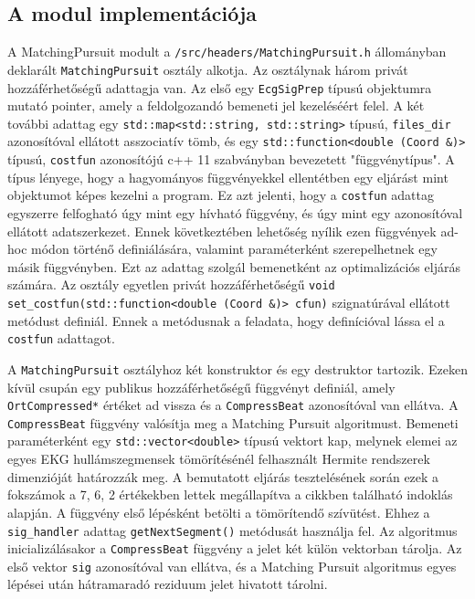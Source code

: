 \documentclass[oneside,titlepage,12pt,a4paper]{report}
\begin{document}
\subsection*{A modul implementációja}

\par A MatchingPursuit modult a \texttt{/src/headers/MatchingPursuit.h} állományban deklarált \texttt{MatchingPursuit} osztály alkotja. Az osztálynak három privát hozzáférhetőségű adattagja van. Az első egy \texttt{EcgSigPrep} típusú objektumra mutató pointer, amely a feldolgozandó bemeneti jel kezeléséért felel. A két további adattag egy \texttt{std::map<std::string, std::string>} típusú, \texttt{files\_dir} azonosítóval ellátott asszociatív tömb, és egy \texttt{std::function<double (Coord \&)>} típusú, \texttt{costfun} azonosítójú c++ 11 szabványban bevezetett "függvénytípus". A típus lényege, hogy a hagyományos függvényekkel ellentétben egy eljárást mint objektumot képes kezelni a program. Ez azt jelenti, hogy a \texttt{costfun} adattag egyszerre felfogható úgy mint egy hívható függvény, és úgy mint egy azonosítóval ellátott adatszerkezet. Ennek következtében lehetőség nyílik ezen függvények ad-hoc módon történő definiálására, valamint paraméterként szerepelhetnek egy másik függvényben. Ezt az adattag szolgál bemenetként az optimalizációs eljárás számára. Az osztály egyetlen privát hozzáférhetőségű \texttt{void set\_costfun(std::function<double (Coord \&)> cfun)} szignatúrával ellátott metódust definiál. Ennek a metódusnak a feladata, hogy definícióval lássa el a \texttt{costfun} adattagot. 
\par A \texttt{MatchingPursuit} osztályhoz két konstruktor és egy destruktor tartozik. Ezeken kívül csupán egy publikus hozzáférhetőségű függvényt definiál, amely \texttt{OrtCompressed*} értéket ad vissza és a \texttt{CompressBeat} azonosítóval van ellátva. 
A \texttt{CompressBeat} függvény valósítja meg a Matching Pursuit algoritmust. Bemeneti paraméterként egy \texttt{std::vector<double>}
típusú vektort kap, melynek elemei az egyes EKG hullámszegmensek tömörítésénél felhasznált Hermite rendszerek dimenzióját határozzák meg. 
A bemutatott eljárás tesztelésének során ezek a fokszámok a 7, 6, 2 értékekben lettek megállapítva a \cite{mp rész a bevezetésben} cikkben 
található indoklás alapján. A függvény első lépésként betölti a tömörítendő szívütést. Ehhez a \texttt{sig\_handler} 
adattag \texttt{getNextSegment()} metódusát használja fel. Az algoritmus inicializálásakor a \texttt{CompressBeat} függvény a jelet két külön vektorban tárolja.
Az első vektor \texttt{sig} azonosítóval van ellátva, és a Matching Pursuit algoritmus egyes lépései után hátramaradó reziduum jelet hivatott tárolni.
\end{document}
